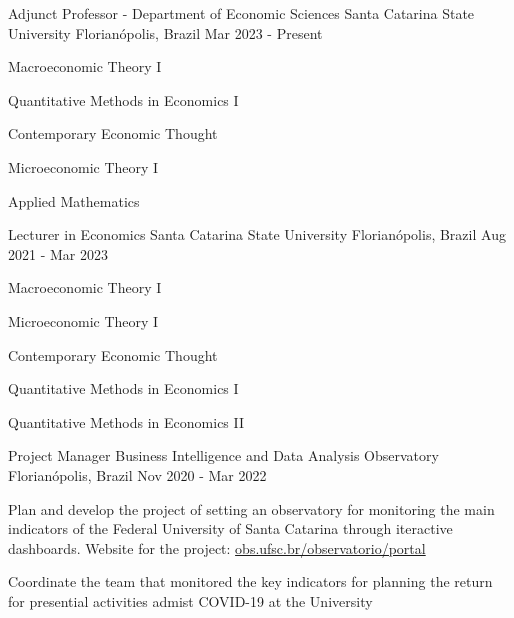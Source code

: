 

\begin{cventries}

  \cventry
    {Adjunct Professor - Department of Economic Sciences} %
    {Santa Catarina State University} %
    {Florianópolis, Brazil} %
    {Mar 2023 - Present} %
    {
     \begin{cvitems} %
        \item {Macroeconomic Theory I}
        \item {Quantitative Methods in Economics I}        
        \item {Contemporary Economic Thought}
        \item {Microeconomic Theory I}        
        \item {Applied Mathematics}
      \end{cvitems}
    }

  \cventry
    {Lecturer in Economics} %
    {Santa Catarina State University} %
    {Florianópolis, Brazil} %
    {Aug 2021 - Mar 2023} %
    {
     \begin{cvitems} %
        \item {Macroeconomic Theory I}
        \item {Microeconomic Theory I}
        \item {Contemporary Economic Thought}
        \item {Quantitative Methods in Economics I}
        \item {Quantitative Methods in Economics II}
      \end{cvitems}
    }

  \cventry
    {Project Manager} %
    {Business Intelligence and Data Analysis Observatory} %
    {Florianópolis, Brazil} %
    {Nov 2020 - Mar 2022} %
    {
      \begin{cvitems} %
        \item {Plan and develop the project of setting an observatory for monitoring the main indicators of the Federal University of Santa Catarina through iteractive dashboards. Website for the project: \href{https://obs.ufsc.br/observatorio/portal/}{obs.ufsc.br/observatorio/portal}}
        \item {Coordinate the team that monitored the key indicators for planning the return for presential activities admist COVID-19 at the University}
      \end{cvitems}
    }


\end{cventries}
